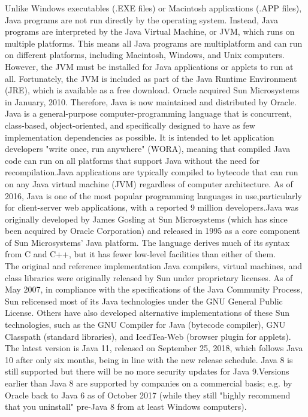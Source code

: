 \documentclass[12pt,a4paper]{article}
\newcommand\tab[1][1cm]{\hspace*{#1}}
\begin{document}
\tab Unlike Windows executables (.EXE files) or Macintosh applications (.APP files),
Java programs are not run directly by the operating system. Instead, Java programs are
interpreted by the Java Virtual Machine, or JVM, which runs on multiple platforms. This
means all Java programs are multiplatform and can run on different platforms, including Macintosh, Windows, and Unix computers. However, the JVM must be installed for Java
applications or applets to run at all. Fortunately, the JVM is included as part of the Java
Runtime Environment (JRE), which is available as a free download. Oracle acquired Sun
Microsystems in January, 2010. Therefore, Java is now maintained and distributed by
Oracle.\\

\tab Java is a general-purpose computer-programming language that is concurrent, class-based, object-oriented, and specifically designed to have as few implementation dependencies as possible. It is intended to let application developers "write once, run anywhere" (WORA), meaning that compiled Java code can run on all platforms that support Java without the need for recompilation.Java applications are typically compiled to bytecode that can run on any Java virtual machine (JVM) regardless of computer architecture. As of 2016, Java is one of the most popular programming languages in use,particularly for client-server web applications, with a reported 9 million developers.Java was originally developed by James Gosling at Sun Microsystems (which has since been acquired by Oracle Corporation) and released in 1995 as a core component of Sun Microsystems' Java platform. The language derives much of its syntax from C and C++, but it has fewer low-level facilities than either of them.\\

\tab The original and reference implementation Java compilers, virtual machines, and class libraries were originally released by Sun under proprietary licenses. As of May 2007, in compliance with the specifications of the Java Community Process, Sun relicensed most of its Java technologies under the GNU General Public License. Others have also developed alternative implementations of these Sun technologies, such as the GNU Compiler for Java (bytecode compiler), GNU Classpath (standard libraries), and IcedTea-Web (browser plugin for applets).
\\
\tab The latest version is Java 11, released on September 25, 2018, which follows Java 10 after only six months, being in line with the new release schedule. Java 8 is still supported but there will be no more security updates for Java 9.Versions earlier than Java 8 are supported by companies on a commercial basis; e.g. by Oracle back to Java 6 as of October 2017 (while they still "highly recommend that you uninstall" pre-Java 8 from at least Windows computers).
\end{document}
